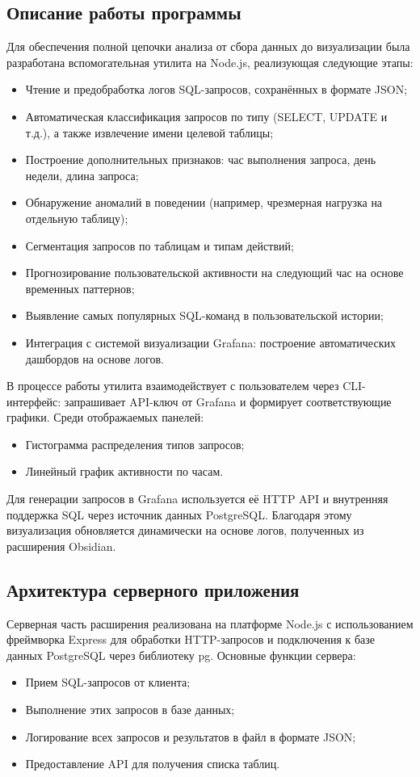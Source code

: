 \documentclass[14pt]{extarticle}
\begin{document}
\subsection*{Описание работы программы}
Для обеспечения полной цепочки анализа от сбора данных до визуализации была разработана вспомогательная утилита на Node.js, реализующая следующие этапы:
\begin{itemize}
    \item Чтение и предобработка логов SQL-запросов, сохранённых в формате JSON;
    \item Автоматическая классификация запросов по типу (SELECT, UPDATE и т.д.), а также извлечение имени целевой таблицы;
    \item Построение дополнительных признаков: час выполнения запроса, день недели, длина запроса;
    \item Обнаружение аномалий в поведении (например, чрезмерная нагрузка на отдельную таблицу);
    \item Сегментация запросов по таблицам и типам действий;
    \item Прогнозирование пользовательской активности на следующий час на основе временных паттернов;
    \item Выявление самых популярных SQL-команд в пользовательской истории;
    \item Интеграция с системой визуализации Grafana: построение автоматических дашбордов на основе логов.
\end{itemize}

В процессе работы утилита взаимодействует с пользователем через CLI-интерфейс: запрашивает API-ключ от Grafana и формирует соответствующие графики. Среди отображаемых панелей:
\begin{itemize}
    \item Гистограмма распределения типов запросов;
    \item Линейный график активности по часам.
\end{itemize}

Для генерации запросов в Grafana используется её HTTP API и внутренняя поддержка SQL через источник данных PostgreSQL. Благодаря этому визуализация обновляется динамически на основе логов, полученных из расширения Obsidian.

\subsection{Архитектура серверного приложения}
Серверная часть расширения реализована на платформе Node.js с использованием фреймворка Express для обработки HTTP-запросов и подключения к базе данных PostgreSQL через библиотеку pg. Основные функции сервера:
\begin{itemize}
    \item Прием SQL-запросов от клиента;
    \item Выполнение этих запросов в базе данных;
    \item Логирование всех запросов и результатов в файл в формате JSON;
    \item Предоставление API для получения списка таблиц.
\end{itemize}
\end{document}
